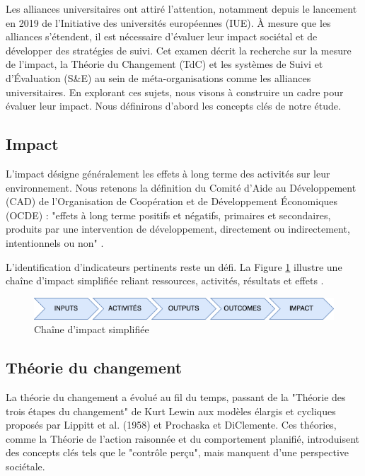 Les alliances universitaires ont attiré l'attention, notamment depuis le lancement en 2019 de l'Initiative des universités européennes (IUE). À mesure que les alliances s'étendent, il est nécessaire d'évaluer leur impact sociétal et de développer des stratégies de suivi. Cet examen décrit la recherche sur la mesure de l'impact, la Théorie du Changement (TdC) et les systèmes de Suivi et d'Évaluation (S\&E) au sein de méta-organisations comme les alliances universitaires. En explorant ces sujets, nous visons à construire un cadre pour évaluer leur impact. Nous définirons d'abord les concepts clés de notre étude.

\subsection{Impact}
L'impact désigne généralement les effets à long terme des activités sur leur environnement. Nous retenons la définition du Comité d'Aide au Développement (CAD) de l'Organisation de Coopération et de Développement Économiques (OCDE) : "effets à long terme positifs et négatifs, primaires et secondaires, produits par une intervention de développement, directement ou indirectement, intentionnels ou non" \cite{oecd_quality_2010}.

L'identification d'indicateurs pertinents reste un défi. La Figure \ref{fig:simplified-impact-chain} illustre une chaîne d'impact simplifiée reliant ressources, activités, résultats et effets \cite{peersman_when_2016}.

\begin{figure}
    \centering 
    \includegraphics[width=1\linewidth]{images/Diagrams-IMPACT.png} 
    \caption{Chaîne d'impact simplifiée\cite{peersman_when_2016}}
    \label{fig:simplified-impact-chain} 
\end{figure}

\subsection{Théorie du changement}
La théorie du changement a évolué au fil du temps, passant de la "Théorie des trois étapes du changement" de Kurt Lewin aux modèles élargis et cycliques proposés par Lippitt et al. (1958) et Prochaska et DiClemente. Ces théories, comme la Théorie de l’action raisonnée et du comportement planifié, introduisent des concepts clés tels que le "contrôle perçu", mais manquent d’une perspective sociétale. 

